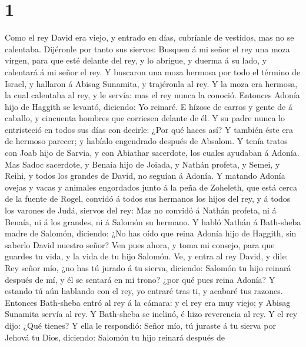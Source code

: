 \hypertarget{section}{%
\section{1}\label{section}}

 Como el rey David era viejo, y entrado en días, cubríanle
de vestidos, mas no se calentaba.  Dijéronle por tanto sus
siervos: Busquen á mi señor el rey una moza virgen, para que esté
delante del rey, y lo abrigue, y duerma á su lado, y calentará á mi
señor el rey.  Y buscaron una moza hermosa por todo el
término de Israel, y hallaron á Abisag Sunamita, y trajéronla al rey.
 Y la moza era hermosa, la cual calentaba al rey, y le
servía: mas el rey nunca la conoció.  Entonces Adonía hijo
de Haggith se levantó, diciendo: Yo reinaré. E hízose de carros y gente
de á caballo, y cincuenta hombres que corriesen delante de él.
 Y su padre nunca lo entristeció en todos sus días con
decirle: ¿Por qué haces así? Y también éste era de hermoso parecer; y
habíalo engendrado después de Absalom.  Y tenía tratos con
Joab hijo de Sarvia, y con Abiathar sacerdote, los cuales ayudaban á
Adonía.  Mas Sadoc sacerdote, y Benaía hijo de Joiada, y
Nathán profeta, y Semei, y Reihi, y todos los grandes de David, no
seguían á Adonía.  Y matando Adonía ovejas y vacas y
animales engordados junto á la peña de Zoheleth, que está cerca de la
fuente de Rogel, convidó á todos sus hermanos los hijos del rey, y á
todos los varones de Judá, siervos del rey:  Mas no
convidó á Nathán profeta, ni á Benaía, ni á los grandes, ni á Salomón su
hermano.  Y habló Nathán á Bath-sheba madre de Salomón,
diciendo: ¿No has oído que reina Adonía hijo de Haggith, sin saberlo
David nuestro señor?  Ven pues ahora, y toma mi consejo,
para que guardes tu vida, y la vida de tu hijo Salomón. 
Ve, y entra al rey David, y dile: Rey señor mío, ¿no has tú jurado á tu
sierva, diciendo: Salomón tu hijo reinará después de mí, y él se sentará
en mi trono? ¿por qué pues reina Adonía?  Y estando tú
aún hablando con el rey, yo entraré tras ti, y acabaré tus razones.
 Entonces Bath-sheba entró al rey á la cámara: y el rey
era muy viejo; y Abisag Sunamita servía al rey.  Y
Bath-sheba se inclinó, é hizo reverencia al rey. Y el rey dijo: ¿Qué
tienes?  Y ella le respondió: Señor mío, tú juraste á tu
sierva por Jehová tu Dios, diciendo: Salomón tu hijo reinará después de
